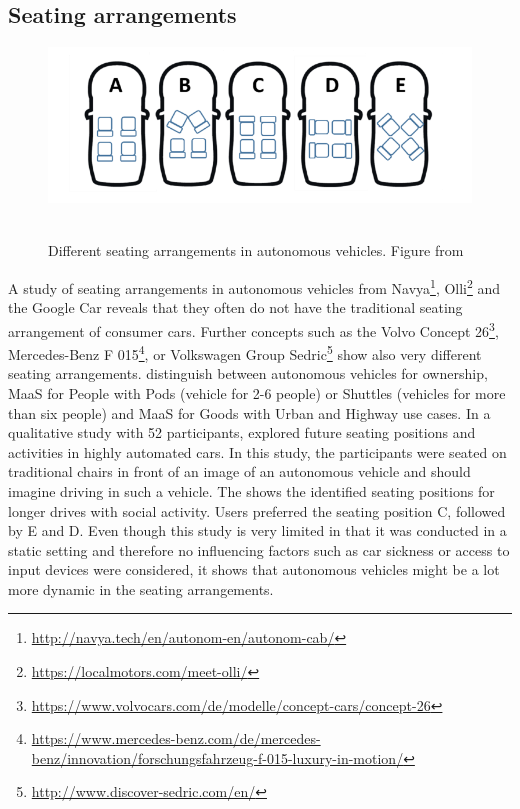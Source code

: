 \subsection{Seating arrangements}\label{ssec:seating}
\begin{figure}
    \includegraphics[width=1\textwidth]{fig/seating}\hfill\
    \caption[Seating arrangements]{Different seating arrangements in autonomous vehicles. Figure from \cite{Jorlov2017}}
    \label{fig:seating}
\end{figure}
A study of seating arrangements in autonomous vehicles from Navya\footnote{\url{http://navya.tech/en/autonom-en/autonom-cab/}}, Olli\footnote{\url{https://localmotors.com/meet-olli/}} and the Google Car reveals that they often do not have the traditional seating arrangement of consumer cars. Further concepts such as the Volvo Concept 26\footnote{\url{https://www.volvocars.com/de/modelle/concept-cars/concept-26}}, Mercedes-Benz F 015\footnote{\url{https://www.mercedes-benz.com/de/mercedes-benz/innovation/forschungsfahrzeug-f-015-luxury-in-motion/}}, or Volkswagen Group Sedric\footnote{\url{http://www.discover-sedric.com/en/}} show also very different seating arrangements.  \citet{Jungwirth2017LeadershipGroup} distinguish between autonomous vehicles for ownership, MaaS for People with Pods (vehicle for 2-6 people) or Shuttles (vehicles for more than six people) and MaaS for Goods with Urban and Highway use cases. In a qualitative study with 52 participants, \citet{Jorlov2017} explored future seating positions and activities in highly automated cars. In this study, the participants were seated on traditional chairs in front of an image of an autonomous vehicle and should imagine driving in such a vehicle. The \emph{} shows the identified seating positions for longer drives with social activity. Users preferred the seating position C, followed by E and D. Even though this study is very limited in that it was conducted in a static setting and therefore no influencing factors such as car sickness or access to input devices were considered, it shows that autonomous vehicles might be a lot more dynamic in the seating arrangements.  

